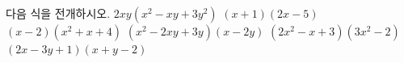 다음 식을 전개하시오.
 $2xy(x^2-xy+3y^2)$
 $(x+1)(2x-5)$
 $(x-2)(x^2+x+4)$
 $(x^2-2xy+3y)(x-2y)$
 $(2x^2-x+3)(3x^2-2)$
 $(2x-3y+1)(x+y-2)$

